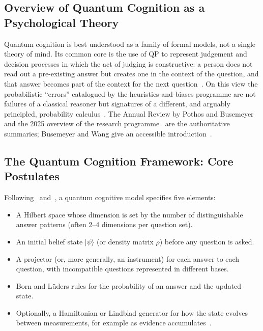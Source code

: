 \documentclass[pdflatex,sn-basic]{sn-jnl}
\newcommand{\ket}[1]{|#1\rangle}
\begin{document}
\subsection{Overview of Quantum Cognition as a Psychological Theory}\label{sec:psych}
Quantum cognition is best understood as a family of formal models, not a single theory of mind. Its common core is the use of QP to represent judgement and decision processes in which the act of judging is constructive: a person does not read out a pre-existing answer but creates one in the context of the question, and that answer becomes part of the context for the next question~\citep{Busemeyer2012,Pothos2013a}. On this view the probabilistic ``errors'' catalogued by the heuristics-and-biases programme are not failures of a classical reasoner but signatures of a different, and arguably principled, probability calculus~\citep{Pothos2017}. The Annual Review by Pothos and Busemeyer~\citep{Pothos2022} and the 2025 overview of the research programme~\citep{Huang2025b} are the authoritative summaries; Busemeyer and Wang give an accessible introduction~\citep{Busemeyer2015}.

\subsection{The Quantum Cognition Framework: Core Postulates}\label{sec:postulates}
Following~\citet{Busemeyer2012} and~\citet{Yearsley2016a}, a quantum cognitive model specifies five elements:

\begin{itemize}
\item A Hilbert space whose dimension is set by the number of distinguishable answer patterns (often 2--4 dimensions per question set).
\item An initial belief state $\ket{\psi}$ (or density matrix $\rho$) before any question is asked.
\item A projector (or, more generally, an instrument) for each answer to each question, with incompatible questions represented in different bases.
\item Born and L\"uders rules for the probability of an answer and the updated state.
\item Optionally, a Hamiltonian or Lindblad generator for how the state evolves between measurements, for example as evidence accumulates~\citep{Busemeyer2006,Busemeyer2020}.
\end{itemize}
\end{document}

